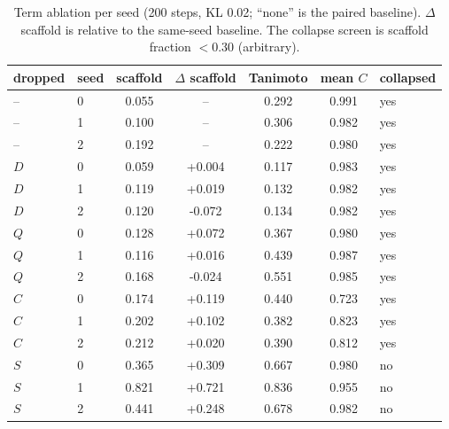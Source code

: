 \documentclass[10pt,letterpaper]{article}
\begin{document}
\begin{table}[!htbp]\centering\small
\caption{Gate arm versus arm A on both corpora, computed from the four \texttt{screened.csv} files of arms A and gate on each corpus. Survivors pass the screen and are not in the (flattened) training corpus; corpus covered = distinct training molecules reproduced / corpus size.}
\label{tab:s4}
\end{table}

\begin{table}[!htbp]\centering\small
\caption{Term ablation per seed (200 steps, KL 0.02; ``none'' is the paired baseline). $\Delta$ scaffold is relative to the same-seed baseline. The collapse screen is scaffold fraction $<0.30$ (arbitrary).}
\label{tab:s5}
\begin{tabular}{@{}llccccl@{}}\toprule
dropped & seed & scaffold & $\Delta$ scaffold & Tanimoto & mean $C$ & collapsed\\\midrule
-- & 0 & 0.055 & -- & 0.292 & 0.991 & yes\\
-- & 1 & 0.100 & -- & 0.306 & 0.982 & yes\\
-- & 2 & 0.192 & -- & 0.222 & 0.980 & yes\\
\midrule
$D$ & 0 & 0.059 & +0.004 & 0.117 & 0.983 & yes\\
$D$ & 1 & 0.119 & +0.019 & 0.132 & 0.982 & yes\\
$D$ & 2 & 0.120 & -0.072 & 0.134 & 0.982 & yes\\
\midrule
$Q$ & 0 & 0.128 & +0.072 & 0.367 & 0.980 & yes\\
$Q$ & 1 & 0.116 & +0.016 & 0.439 & 0.987 & yes\\
$Q$ & 2 & 0.168 & -0.024 & 0.551 & 0.985 & yes\\
\midrule
$C$ & 0 & 0.174 & +0.119 & 0.440 & 0.723 & yes\\
$C$ & 1 & 0.202 & +0.102 & 0.382 & 0.823 & yes\\
$C$ & 2 & 0.212 & +0.020 & 0.390 & 0.812 & yes\\
\midrule
$S$ & 0 & 0.365 & +0.309 & 0.667 & 0.980 & no\\
$S$ & 1 & 0.821 & +0.721 & 0.836 & 0.955 & no\\
$S$ & 2 & 0.441 & +0.248 & 0.678 & 0.982 & no\\
\bottomrule\end{tabular}
\end{table}
\end{document}
